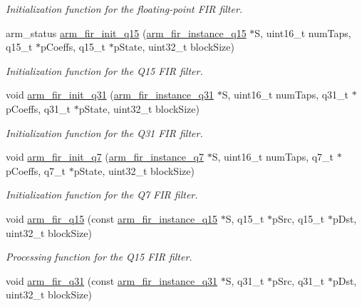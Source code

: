 \begin{DoxyCompactItemize}
\begin{DoxyCompactList}\small\item\em Initialization function for the floating-\/point F\-I\-R filter. \end{DoxyCompactList}\item 
arm\-\_\-status \hyperlink{group___f_i_r_gae2a50f692f41ba57e44ed0719b1368bd}{arm\-\_\-fir\-\_\-init\-\_\-q15} (\hyperlink{structarm__fir__instance__q15}{arm\-\_\-fir\-\_\-instance\-\_\-q15} $\ast$S, uint16\-\_\-t num\-Taps, q15\-\_\-t $\ast$p\-Coeffs, q15\-\_\-t $\ast$p\-State, uint32\-\_\-t block\-Size)
\begin{DoxyCompactList}\small\item\em Initialization function for the Q15 F\-I\-R filter. \end{DoxyCompactList}\item 
void \hyperlink{group___f_i_r_gac00d53af87684cbbe135767b55e748a5}{arm\-\_\-fir\-\_\-init\-\_\-q31} (\hyperlink{structarm__fir__instance__q31}{arm\-\_\-fir\-\_\-instance\-\_\-q31} $\ast$S, uint16\-\_\-t num\-Taps, q31\-\_\-t $\ast$p\-Coeffs, q31\-\_\-t $\ast$p\-State, uint32\-\_\-t block\-Size)
\begin{DoxyCompactList}\small\item\em Initialization function for the Q31 F\-I\-R filter. \end{DoxyCompactList}\item 
void \hyperlink{group___f_i_r_ga88e48688224d42dc173dbcec702f0c1d}{arm\-\_\-fir\-\_\-init\-\_\-q7} (\hyperlink{structarm__fir__instance__q7}{arm\-\_\-fir\-\_\-instance\-\_\-q7} $\ast$S, uint16\-\_\-t num\-Taps, q7\-\_\-t $\ast$p\-Coeffs, q7\-\_\-t $\ast$p\-State, uint32\-\_\-t block\-Size)
\begin{DoxyCompactList}\small\item\em Initialization function for the Q7 F\-I\-R filter. \end{DoxyCompactList}\item 
void \hyperlink{group___f_i_r_ga262d173058d6f80fdf60404ba262a8f5}{arm\-\_\-fir\-\_\-q15} (const \hyperlink{structarm__fir__instance__q15}{arm\-\_\-fir\-\_\-instance\-\_\-q15} $\ast$S, q15\-\_\-t $\ast$p\-Src, q15\-\_\-t $\ast$p\-Dst, uint32\-\_\-t block\-Size)
\begin{DoxyCompactList}\small\item\em Processing function for the Q15 F\-I\-R filter. \end{DoxyCompactList}\item 
void \hyperlink{group___f_i_r_gaadd938c68ab08967cbb5fc696f384bb5}{arm\-\_\-fir\-\_\-q31} (const \hyperlink{structarm__fir__instance__q31}{arm\-\_\-fir\-\_\-instance\-\_\-q31} $\ast$S, q31\-\_\-t $\ast$p\-Src, q31\-\_\-t $\ast$p\-Dst, uint32\-\_\-t block\-Size)

\end{DoxyCompactItemize}
